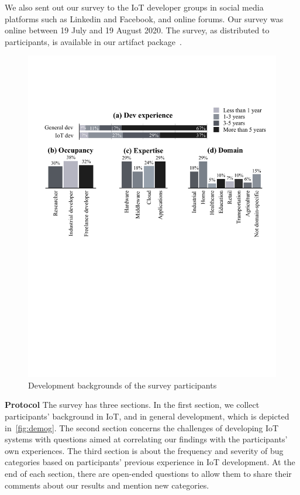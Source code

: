We also sent out our survey to the IoT developer groups in social media platforms such as Linkedin and Facebook, and online forums. Our survey was online between 19 July and 19 August 2020. The survey, as distributed to participants, is available in our artifact package~\cite{repPack}.
 \begin{figure}
  \centering
   \includegraphics[width=\linewidth]{imgs/demog.pdf}
  \caption{Development backgrounds of the survey participants}
  \label{fig:demog}
\end{figure}

\textbf{Protocol}
The survey has three sections. In the first section, we collect participants' background in IoT, and in general development, which is depicted in~\autoref{fig:demog}. The second section concerns the challenges of developing IoT systems with questions aimed at correlating our findings with the participants' own experiences. The third section is about the frequency and severity of bug categories based on participants' previous experience in IoT development. At the end of each section, there are open-ended questions to allow them to share their comments about our results and mention new categories.

